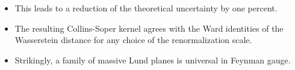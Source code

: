 \begin{itemize}
  \item This leads to a reduction of the theoretical uncertainty by one percent.
  \item The resulting Collins-Soper kernel agrees with the Ward identities of the Wasserstein distance for any choice of the renormalization scale.
  \item Strikingly, a family of massive Lund planes is universal in Feynman gauge.
\end{itemize}

